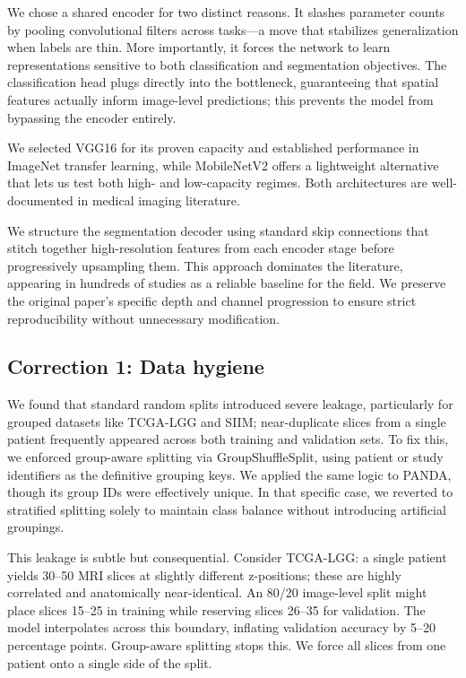\documentclass[conference,a4paper]{IEEEtran}
\begin{document}
We chose a shared encoder for two distinct reasons. It slashes parameter counts by pooling convolutional filters across tasks—a move that stabilizes generalization when labels are thin. More importantly, it forces the network to learn representations sensitive to both classification and segmentation objectives. The classification head plugs directly into the bottleneck, guaranteeing that spatial features actually inform image-level predictions; this prevents the model from bypassing the encoder entirely.

We selected VGG16 for its proven capacity and established performance in ImageNet transfer learning, while MobileNetV2 offers a lightweight alternative that lets us test both high- and low-capacity regimes. Both architectures are well-documented in medical imaging literature.

We structure the segmentation decoder using standard skip connections that stitch together high-resolution features from each encoder stage before progressively upsampling them. This approach dominates the literature, appearing in hundreds of studies as a reliable baseline for the field. We preserve the original paper’s specific depth and channel progression to ensure strict reproducibility without unnecessary modification.

\subsection{Correction 1: Data hygiene}
We found that standard random splits introduced severe leakage, particularly for grouped datasets like TCGA-LGG and SIIM; near-duplicate slices from a single patient frequently appeared across both training and validation sets. To fix this, we enforced group-aware splitting via GroupShuffleSplit, using patient or study identifiers as the definitive grouping keys. We applied the same logic to PANDA, though its group IDs were effectively unique. In that specific case, we reverted to stratified splitting solely to maintain class balance without introducing artificial groupings.

This leakage is subtle but consequential. Consider TCGA-LGG: a single patient yields 30--50 MRI slices at slightly different z-positions; these are highly correlated and anatomically near-identical. An 80/20 image-level split might place slices 15--25 in training while reserving slices 26--35 for validation. The model interpolates across this boundary, inflating validation accuracy by 5--20 percentage points. Group-aware splitting stops this. We force all slices from one patient onto a single side of the split.
\end{document}
